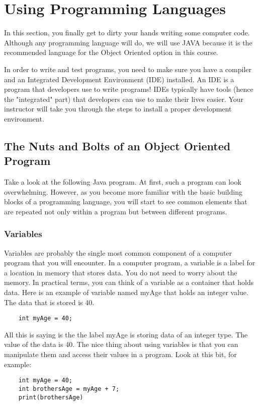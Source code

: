 \section{Using Programming Languages}
In this section, you finally get to dirty your hands writing some computer code. Although any programming language will do, we will use JAVA because it is the recommended language for the Object Oriented option in this course.

In order to write and test programs, you need to make sure you have a compiler and an Integrated Development Environment (IDE) installed. An IDE is a program that developers use to write programs! IDEs typically have tools (hence the "integrated" part) that developers can use to make their lives easier. Your instructor will take you through the steps to install a proper development environment.

\subsection{The Nuts and Bolts of an Object Oriented Program}
Take a look at the following Java program. At first, such a program can look overwhelming. However, as you become more familiar with the basic building blocks of a programming language, you will start to see common elements that are repeated not only within a program but between different programs.
	

\subsubsection*{Variables}
Variables are probably the single most common component of a computer program that you will encounter. In a computer program, a variable is a label for a location in memory that stores data. You do not need to worry about the memory. In practical terms, you can think of a variable as a container that holds data. Here is an example of variable named myAge that holds an integer value. The data that is stored is 40. 
	\begin{verbatim}
	int myAge = 40;
	\end{verbatim} 
All this is saying is the the label myAge is storing data of an integer type. The value of the data is 40.
The nice thing about using variables is that you can manipulate them and access their values in a program. Look at this bit, for example:
	\begin{verbatim}
	int myAge = 40;
	int brothersAge = myAge + 7;
	print(brothersAge)
	\end{verbatim}
	
